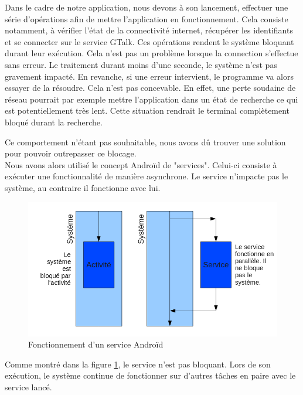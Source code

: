  
Dans le cadre de notre application, nous devons à son lancement, effectuer une série d'opérations 
afin de mettre l'application en fonctionnement. Cela consiste notamment, à vérifier l'état de la 
connectivité internet, récupérer les identifiants et se connecter sur le service GTalk. Ces 
opérations rendent le système bloquant durant leur exécution. Cela n'est pas un problème lorsque la 
connection s'effectue sans erreur. Le traitement durant moins d'une seconde, le système n'est pas
gravement impacté. En revanche, si une erreur intervient, le programme va alors essayer de la résoudre.
Cela n'est pas concevable. En effet, une perte soudaine de réseau pourrait par exemple mettre 
l'application dans un état de recherche ce qui est potentiellement très lent. Cette situation rendrait
le terminal complètement bloqué durant la recherche. 
 
Ce comportement n'étant pas souhaitable, nous avons dû trouver une solution pour pouvoir outrepasser ce blocage.
\\
 
 
Nous avons alors utilisé le concept Androïd de "services". Celui-ci consiste à exécuter une fonctionnalité 
de manière asynchrone. Le service n'impacte pas le système, au contraire il fonctionne avec lui. 
 
\begin{figure}[!h]
  \center
  \includegraphics[width=13cm]{img/fonctionnement-des-services-android.png}
  \caption{Fonctionnement d'un service Androïd}
  \label{fonctionnement-des-services-android}
\end{figure}
 
Comme montré dans la figure \ref{fonctionnement-des-services-android}, le service n'est pas  bloquant. 
Lors de son exécution, le système continue de fonctionner sur d'autres tâches en paire avec le service lancé.
\\
 
